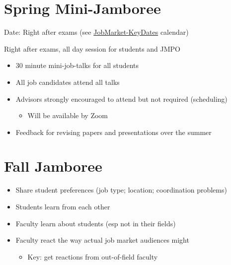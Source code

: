\documentclass{scrartcl}
\begin{document}
\medskip


\hypertarget{jamboree-mini-spring}{}
\section*{Spring Mini-Jamboree}

Date: Right after exams (see \href{https://calendar.google.com/calendar/u/0?cid=amh1ZWNvbi5vcmdfYnUyM2xoNXA2a2IwbjMzYmprdWI0am5pa3NAZ3JvdXAuY2FsZW5kYXIuZ29vZ2xlLmNvbQ}{JobMarket-KeyDates} calendar)

Right after exams, all day session for students and JMPO
\begin{itemize}
  
\item 30 minute mini-job-talks for all students
\item All job candidates attend all talks
\item Advisors strongly encouraged to attend but not required (scheduling)
  \begin{itemize}
  \item Will be available by Zoom
  \end{itemize}
\item Feedback for revising papers and presentations over the summer
\end{itemize}

\hypertarget{jamboree-maxi-fall}{}
\section*{Fall Jamboree}

\begin{itemize}
\item Share student preferences (job type; location; coordination problems)
\item Students learn from each other
\item Faculty learn about students (esp not in their fields)
\item Faculty react the way actual job market audiences might
  \begin{itemize}
  \item Key: get reactions from out-of-field faculty
  \end{itemize}
\end{itemize}
\end{document}
